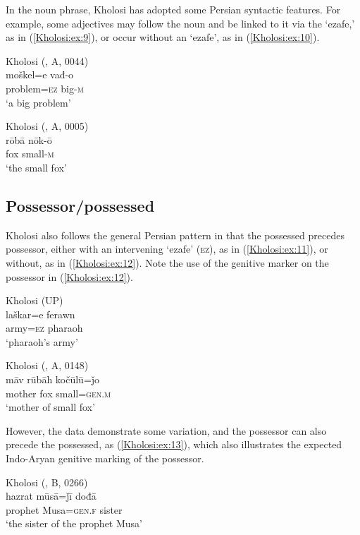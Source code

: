 \documentclass[output=paper,colorlinks,citecolor=brown]{langscibook}
\begin{document}
In the noun phrase, Kholosi has adopted some Persian syntactic features. For example, some adjectives may follow the noun and be linked to it via the `ezafe,' as in (\ref{Kholosi:ex:9}), or occur without an `ezafe', as in (\ref{Kholosi:ex:10}).

\ea\label{Kholosi:ex:9}
Kholosi (\citealt{nourzaei_kholosi_2022}, A, 0044)\\
\gll moškel=e vađ-o \\
problem\textsc{=ez} big\textsc{-m} \\
\glt `a big problem'
\z

\ea\label{Kholosi:ex:10}
Kholosi (\citealt{nourzaei_kholosi_2022}, A, 0005)\\
\gll rōbā nōk-ō \\
fox small\textsc{-m} \\
\glt `the small fox'
\z

\subsection{Possessor/possessed}\label{Kholosi:ss:3.2}

Kholosi also follows the general Persian pattern in that the possessed precedes possessor, either with an intervening `ezafe' (\textsc{ez}), as in (\ref{Kholosi:ex:11}), or without, as in (\ref{Kholosi:ex:12}). Note the use of the genitive marker on the possessor in (\ref{Kholosi:ex:12}).

\ea\label{Kholosi:ex:11}
Kholosi (UP)\\
\gll laškar=e ferawn \\
army\textsc{=ez} pharaoh \\
\glt `pharaoh's army'
\z

\ea\label{Kholosi:ex:12}
Kholosi (\citealt{nourzaei_kholosi_2022}, A, 0148)\\
\gll māv rūbāh kočūlū=ǰo \\
mother fox small\textsc{=gen.m} \\
\glt `mother of small fox'
\z

However, the data demonstrate some variation, and the possessor can also precede the possessed, as (\ref{Kholosi:ex:13}), which also illustrates the expected Indo-Aryan genitive marking of the possessor. 

\ea\label{Kholosi:ex:13}
Kholosi (\citealt{nourzaei_kholosi_2022}, B, 0266)\\
\gll hazrat mūsā=ǰī dođā \\
prophet {M}usa\textsc{=gen.f} sister \\
\glt `the sister of the prophet Musa'
\z
\end{document}
